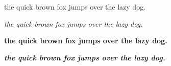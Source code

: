 \documentclass[a4paper,12pt]{article}
\begin{document}
\par the quick brown fox jumps over the lazy dog.
\par\textit{the quick brown fox jumps over the lazy dog.}
\par\textbf{the quick brown fox jumps over the lazy dog.}
\par\textbf{\textit{the quick brown fox jumps over the lazy dog.}}
\end{document}
